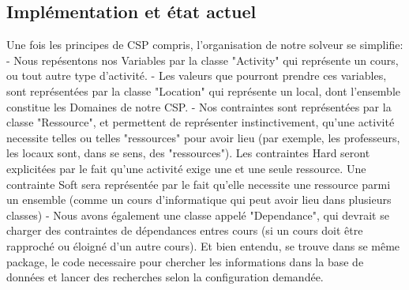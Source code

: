 \subsection{Implémentation et état actuel}
Une fois les principes de CSP compris, l'organisation de notre solveur se simplifie: 
- Nous repésentons nos Variables par la classe "Activity" qui représente un cours, ou tout autre type d'activité.\newline
- Les valeurs que pourront prendre ces variables, sont représentées par la classe "Location" qui représente un local, dont l'ensemble constitue les Domaines de notre CSP.\newline
- Nos contraintes sont représentées par la classe "Ressource", et permettent de représenter instinctivement, qu'une activité necessite telles ou telles "ressources" pour avoir lieu (par exemple, les professeurs, les locaux sont, dans se sens, des "ressources"). Les contraintes Hard seront explicitées par le fait qu'une activité exige une et une seule ressource. Une contrainte Soft sera représentée par le fait qu'elle necessite une ressource parmi un ensemble (comme un cours d'informatique qui peut avoir lieu dans plusieurs classes) \newline
- Nous avons également une classe appelé "Dependance", qui devrait se charger des contraintes de dépendances entres cours (si un cours doit être rapproché ou éloigné d'un autre cours). \newline
Et bien entendu, se trouve dans se même package, le code necessaire pour chercher les informations dans la base de données et lancer des recherches selon la configuration demandée.

\indent

